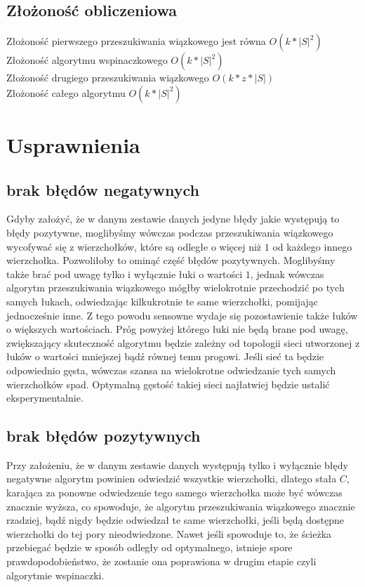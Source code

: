 \documentclass{article}
\begin{document}
\subsection{Złożoność obliczeniowa}
Złożoność pierwszego przeszukiwania wiązkowego jest równa $O(k*|S|^2)$ \\
Złożoność algorytmu wspinaczkowego $O(k*|S|^2)$ \\
Złożoność drugiego przeszukiwania wiązkowego $O(k*z*|S|)$\\
Złożoność całego algorytmu $O(k*|S|^2)$
\section{Usprawnienia}
\subsection{brak błędów negatywnych}
Gdyby założyć, że w danym zestawie danych jedyne błędy jakie występują to błędy pozytywne, moglibyśmy wówczas podczas przeszukiwania wiązkowego wycofywać się z wierzchołków, które są odległe o więcej niż $1$ od każdego innego wierzchołka. Pozwoliłoby to ominąć część błędów pozytywnych. Moglibyśmy także brać pod uwagę tylko i wyłącznie łuki o wartości $1$, jednak wówczas algorytm przeszukiwania wiązkowego mógłby wielokrotnie przechodzić po tych samych łukach, odwiedzając kilkukrotnie te same wierzchołki, pomijając jednocześnie inne. Z tego powodu sensowne wydaje się pozostawienie także łuków o większych wartościach. Próg powyżej którego łuki nie będą brane pod uwagę, zwiększający skuteczność algorytmu będzie zależny od topologii sieci utworzonej z łuków o wartości mniejszej bądź równej temu progowi. Jeśli sieć ta będzie odpowiednio gęsta, wówczas szansa na wielokrotne odwiedzanie tych samych wierzchołków spad. Optymalną gęstość takiej sieci najłatwiej będzie ustalić eksperymentalnie.
\subsection{brak błędów pozytywnych}
Przy założeniu, że w danym zestawie danych występują tylko i wyłącznie błędy negatywne algorytm powinien odwiedzić wszystkie wierzchołki, dlatego stała $C$, karająca za ponowne odwiedzenie tego samego wierzchołka może być wówczas znacznie wyższa, co spowoduje, że algorytm przeszukiwania wiązkowego znacznie rzadziej, bądź nigdy będzie odwiedzał te same wierzchołki, jeśli będą dostępne wierzchołki do tej pory nieodwiedzone. Nawet jeśli spowoduje to, że ścieżka przebiegać będzie w sposób odległy od optymalnego, istnieje spore prawdopodobieństwo, że zostanie ona poprawiona w drugim etapie czyli algorytmie wspinaczki.
\end{document}
